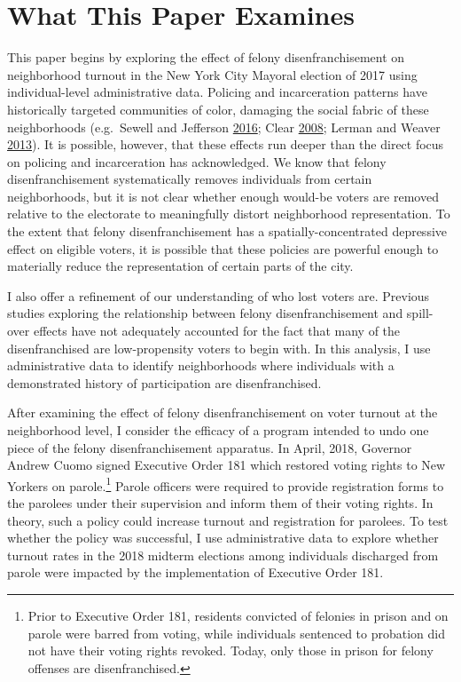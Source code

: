 \documentclass[]{article}
\let\rmarkdownfootnote\footnote%
\def\footnote{\protect\rmarkdownfootnote}
\begin{document}
\hypertarget{what-this-paper-examines}{%
\section{What This Paper Examines}\label{what-this-paper-examines}}

This paper begins by exploring the effect of felony disenfranchisement on neighborhood turnout in the New York City Mayoral election of 2017 using individual-level administrative data. Policing and incarceration patterns have historically targeted communities of color, damaging the social fabric of these neighborhoods (e.g.~Sewell and Jefferson \protect\hyperlink{ref-Sewell2016}{2016}; Clear \protect\hyperlink{ref-Clear2008}{2008}; Lerman and Weaver \protect\hyperlink{ref-Lerman2013}{2013}). It is possible, however, that these effects run deeper than the direct focus on policing and incarceration has acknowledged. We know that felony disenfranchisement systematically removes individuals from certain neighborhoods, but it is not clear whether enough would-be voters are removed relative to the electorate to meaningfully distort neighborhood representation. To the extent that felony disenfranchisement has a spatially-concentrated depressive effect on eligible voters, it is possible that these policies are powerful enough to materially reduce the representation of certain parts of the city.

I also offer a refinement of our understanding of who lost voters are. Previous studies exploring the relationship between felony disenfranchisement and spill-over effects have not adequately accounted for the fact that many of the disenfranchised are low-propensity voters to begin with. In this analysis, I use administrative data to identify neighborhoods where individuals with a demonstrated history of participation are disenfranchised.

After examining the effect of felony disenfranchisement on voter turnout at the neighborhood level, I consider the efficacy of a program intended to undo one piece of the felony disenfranchisement apparatus. In April, 2018, Governor Andrew Cuomo signed Executive Order 181 which restored voting rights to New Yorkers on parole.\footnote{Prior to Executive Order 181, residents convicted of felonies in prison and on parole were barred from voting, while individuals sentenced to probation did not have their voting rights revoked. Today, only those in prison for felony offenses are disenfranchised.} Parole officers were required to provide registration forms to the parolees under their supervision and inform them of their voting rights. In theory, such a policy could increase turnout and registration for parolees. To test whether the policy was successful, I use administrative data to explore whether turnout rates in the 2018 midterm elections among individuals discharged from parole were impacted by the implementation of Executive Order 181.
\end{document}
